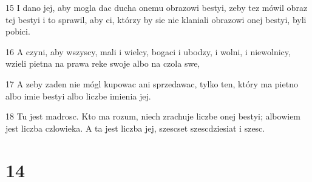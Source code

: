 \par 15 I dano jej, aby mogla dac ducha onemu obrazowi bestyi, zeby tez mówil obraz tej bestyi i to sprawil, aby ci, którzy by sie nie klaniali obrazowi onej bestyi, byli pobici.
\par 16 A czyni, aby wszyscy, mali i wielcy, bogaci i ubodzy, i wolni, i niewolnicy, wzieli pietna na prawa reke swoje albo na czola swe,
\par 17 A zeby zaden nie mógl kupowac ani sprzedawac, tylko ten, który ma pietno albo imie bestyi albo liczbe imienia jej.
\par 18 Tu jest madrosc. Kto ma rozum, niech zrachuje liczbe onej bestyi; albowiem jest liczba czlowieka. A ta jest liczba jej, szescset szescdziesiat i szesc.

\chapter{14}

